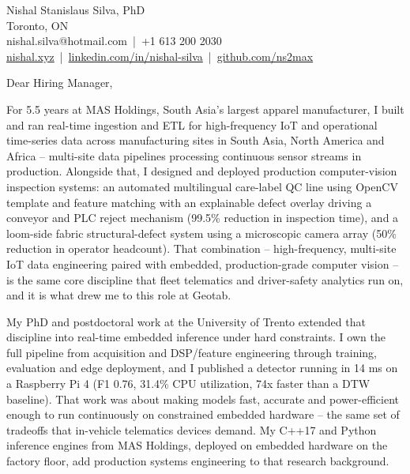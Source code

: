 \documentclass[11pt]{article}
\begin{document}
\pagestyle{empty}

\noindent
Nishal Stanislaus Silva, PhD \\
Toronto, ON \\
nishal.silva@hotmail.com \,|\, +1 613 200 2030 \\
\href{https://nishal.xyz}{nishal.xyz} \,|\, \href{https://www.linkedin.com/in/nishal-silva}{linkedin.com/in/nishal-silva} \,|\, \href{https://github.com/ns2max}{github.com/ns2max}

\vspace{1em}

\noindent Dear Hiring Manager,

\vspace{1em}

\noindent For 5.5 years at MAS Holdings, South Asia's largest apparel manufacturer, I built and ran real-time ingestion and ETL for high-frequency IoT and operational time-series data across manufacturing sites in South Asia, North America and Africa -- multi-site data pipelines processing continuous sensor streams in production. Alongside that, I designed and deployed production computer-vision inspection systems: an automated multilingual care-label QC line using OpenCV template and feature matching with an explainable defect overlay driving a conveyor and PLC reject mechanism (99.5\% reduction in inspection time), and a loom-side fabric structural-defect system using a microscopic camera array (50\% reduction in operator headcount). That combination -- high-frequency, multi-site IoT data engineering paired with embedded, production-grade computer vision -- is the same core discipline that fleet telematics and driver-safety analytics run on, and it is what drew me to this role at Geotab.

\vspace{1em}

\noindent My PhD and postdoctoral work at the University of Trento extended that discipline into real-time embedded inference under hard constraints. I own the full pipeline from acquisition and DSP/feature engineering through training, evaluation and edge deployment, and I published a detector running in 14 ms on a Raspberry Pi 4 (F1 0.76, 31.4\% CPU utilization, 74x faster than a DTW baseline). That work was about making models fast, accurate and power-efficient enough to run continuously on constrained embedded hardware -- the same set of tradeoffs that in-vehicle telematics devices demand. My C++17 and Python inference engines from MAS Holdings, deployed on embedded hardware on the factory floor, add production systems engineering to that research background.
\end{document}
